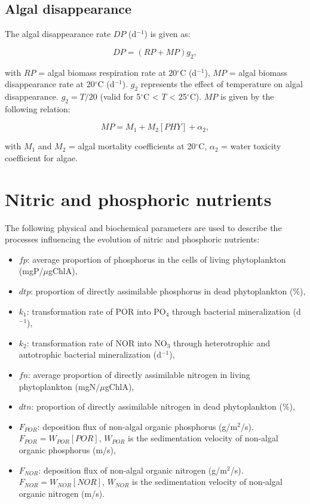 \subsection{Algal disappearance}

The algal disappearance rate $DP$ (d$^{-1}$) is given as:

\begin{equation}
  DP = (RP+MP) g_2,
\end{equation}

with $RP$ = algal biomass respiration rate at 20$^{\circ}$C (d$^{-1}$),
$MP$ = algal biomass disappearance rate at 20$^{\circ}$C (d$^{-1}$).
$g_2$ represents the effect of temperature on algal disappearance.
$g_2 = T/20$ (valid for 5$^{\circ}$C < $T$ < 25$^{\circ}$C).
$MP$ is given by the following relation:

\begin{equation}
  MP = M_1 + M_2 [PHY] + \alpha_2,
\end{equation}

with $M_1$ and $M_2$ = algal mortality coefficients at 20$^{\circ}$C,
$\alpha_2$ = water toxicity coefficient for algae.

\section{Nitric and phosphoric nutrients}

The following physical and biochemical parameters are used
to describe the processes influencing the evolution of nitric and phosphoric nutrients:

\begin{itemize}
\item $fp$: average proportion of phosphorus in the cells of living phytoplankton (mgP/$\mu$gChlA),
\item $dtp$: proportion of directly assimilable phosphorus in dead phytoplankton ($\%$),
\item $k_1$: transformation rate of POR into PO$_4$ through bacterial mineralization (d$^{-1}$),
\item $k_2$: transformation rate of NOR into NO$_3$ through heterotrophic
  and autotrophic bacterial mineralization (d$^{-1}$),
\item $fn$: average proportion of directly assimilable nitrogen in living phytoplankton (mgN/$\mu$gChlA),
\item $dtn$: proportion of directly assimilable nitrogen in dead phytoplankton ($\%$),
\item $F_{POR}$: deposition flux of non-algal organic phosphorus (g/m$^2$/s).
  $F_{POR} = W_{POR} [POR]$, $W_{POR}$ is the sedimentation velocity of non-algal organic phosphorus (m/s),
\item $F_{NOR}$: deposition flux of non-algal organic nitrogen (g/m$^2$/s).
  $F_{NOR} = W_{NOR} [NOR]$, $W_{NOR}$ is the sedimentation velocity of non-algal organic nitrogen (m/s).
\end{itemize}

